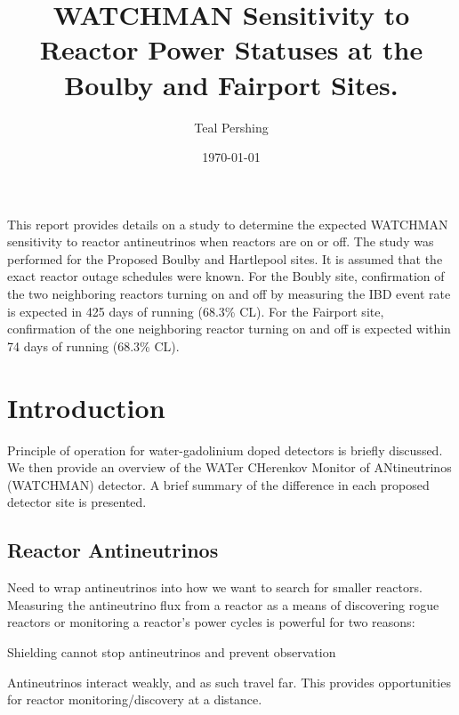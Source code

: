 \documentclass{article}
\title{WATCHMAN Sensitivity to Reactor Power Statuses at the Boulby and
Fairport Sites.}
\author{Teal Pershing}
\date{\today}
\begin{document}
\maketitle %

This report provides details on a study to determine the expected WATCHMAN
sensitivity to reactor antineutrinos when reactors are on or off.  The study
was performed for the Proposed Boulby and Hartlepool sites. It is assumed that
the exact reactor outage schedules were known.  For the Boubly site, confirmation
of the two neighboring reactors turning on and off by measuring the IBD event 
rate is expected in
425 days of running (68.3\% CL).  For the Fairport site, confirmation of the one
neighboring reactor turning on and off is expected within 74 days of running (68.3\% CL).


\section{Introduction}

Principle of operation for water-gadolinium doped detectors is briefly discussed.
We then provide an overview of the WATer CHerenkov Monitor of ANtineutrinos 
(WATCHMAN) detector.  A brief summary of the difference in each proposed detector
site is presented.

\subsection{Reactor Antineutrinos}

Need to wrap antineutrinos into how we want to search for smaller reactors.  
Measuring the antineutrino flux from a reactor as a means of discovering rogue
reactors or monitoring a reactor's power cycles is powerful for two reasons:

\item{Shielding cannot stop antineutrinos and prevent observation}
\item{Antineutrinos interact weakly, and as such travel far.  This provides
    opportunities for reactor monitoring/discovery at a distance.}
\end{document}
